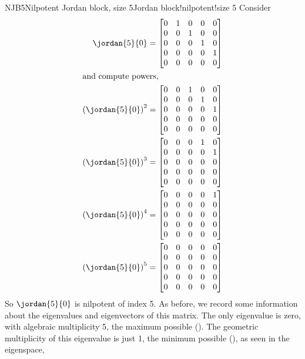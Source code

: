 \begin{example}{NJB5}{Nilpotent Jordan block, size 5}{Jordan block!nilpotent!size 5}
Consider
%
\begin{align*}
%
\jordan{5}{0}&=
\begin{bmatrix}
0 & 1 & 0 & 0 & 0\\
0 & 0 & 1 & 0 & 0\\
0 & 0 & 0 & 1 & 0\\
0 & 0 & 0 & 0 & 1\\
0 & 0 & 0 & 0 & 0
\end{bmatrix}\\
%
\intertext{and compute powers,}
%
\left(\jordan{5}{0}\right)^2&=
\begin{bmatrix}
 0 & 0 & 1 & 0 & 0 \\
 0 & 0 & 0 & 1 & 0 \\
 0 & 0 & 0 & 0 & 1 \\
 0 & 0 & 0 & 0 & 0 \\
 0 & 0 & 0 & 0 & 0
\end{bmatrix}\\
%
\left(\jordan{5}{0}\right)^3&=
\begin{bmatrix}
 0 & 0 & 0 & 1 & 0 \\
 0 & 0 & 0 & 0 & 1 \\
 0 & 0 & 0 & 0 & 0 \\
 0 & 0 & 0 & 0 & 0 \\
 0 & 0 & 0 & 0 & 0
\end{bmatrix}\\
%
\left(\jordan{5}{0}\right)^4&=
\begin{bmatrix}
 0 & 0 & 0 & 0 & 1 \\
 0 & 0 & 0 & 0 & 0 \\
 0 & 0 & 0 & 0 & 0 \\
 0 & 0 & 0 & 0 & 0 \\
 0 & 0 & 0 & 0 & 0
\end{bmatrix}\\
%
\left(\jordan{5}{0}\right)^5&=
\begin{bmatrix}
 0 & 0 & 0 & 0 & 0 \\
 0 & 0 & 0 & 0 & 0 \\
 0 & 0 & 0 & 0 & 0 \\
 0 & 0 & 0 & 0 & 0 \\
 0 & 0 & 0 & 0 & 0
\end{bmatrix}\\
%
\end{align*}
%
So $\jordan{5}{0}$ is nilpotent of index 5.  As before, we record some information about the eigenvalues and eigenvectors of this matrix.  The only eigenvalue is zero, with algebraic multiplicity 5, the maximum possible ().  The geometric multiplicity of this eigenvalue is just 1, the minimum possible (), as seen in the eigenspace,

\end{example}
